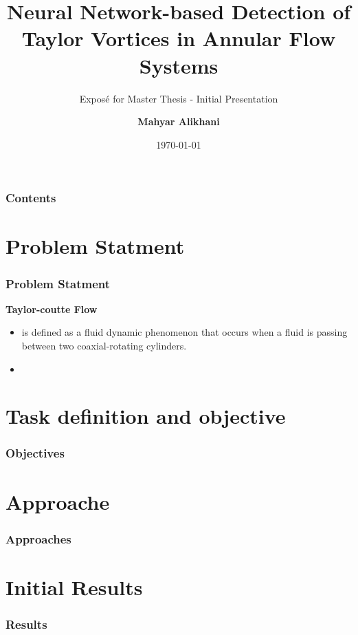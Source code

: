 \documentclass[aspectratio=169]{beamer}
\title{Neural Network-based Detection of Taylor Vortices in Annular Flow Systems}
\subtitle{Exposé for Master Thesis - Initial Presentation}
\author{\textbf{Mahyar Alikhani}}
\institute{Institute of Applied Mechanics}
\date{\today}
\begin{document}
\begin{frame}
\titlepage
\end{frame}

\begin{frame}
\frametitle{Contents}
\tableofcontents
\end{frame}

\section{Problem Statment}
\begin{frame}
  \frametitle{Problem Statment}
  \large \color{TUCgreen}\textbf{Taylor-coutte Flow}
  \begin{itemize}
    \item is defined as a fluid dynamic phenomenon that occurs when a fluid is passing between two coaxial-rotating cylinders.
    \item 
  \end{itemize}
\end{frame}

\section{Task definition and objective}
\begin{frame}
  \frametitle{Objectives}
\end{frame}


\section{Approache}
\begin{frame}
  \frametitle{Approaches}
\end{frame}
\section{Initial Results}
\begin{frame}
  \frametitle{Results}
\end{frame}

\begin{frame}
\frametitle{}\
  \begin{minipage}{0.45\textwidth}
    \centering
    \vfill
  \end{minipage}
  \begin{minipage}{0.45\textwidth}
    \centering
    \vfill
  \end{minipage}
\end{frame}
\end{document}
